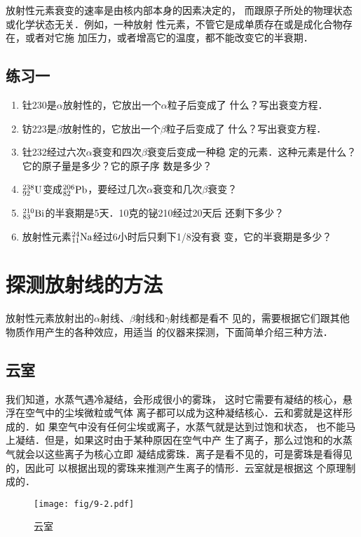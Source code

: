 放射性元素衰变的速率是由核内部本身的因素决定的，
而跟原子所处的物理状态或化学状态无关．例如，一种放射
性元素，不管它是成单质存在或是成化合物存在，或者对它施
加压力，或者增高它的温度，都不能改变它的半衰期．

\subsection*{练习一}
\begin{enumerate}
    \item 钍230是$\alpha$放射性的，它放出一个$\alpha$粒子后变成了
什么？写出衰变方程．
\item 钫223是$\beta$放射性的，它放出一个$\beta$粒子后变成了
什么？写出衰变方程．
\item 钍232经过六次$\alpha$衰变和四次$\beta$衰变后变成一种稳
定的元素．这种元素是什么？它的原子量是多少？它的原子序
数是多少？
\item 
$\atom{U}{238}{92}$变成$\atom{Pb}{206}{82}$，要经过几次$\alpha$衰变和几次$\beta$衰变？
\item 
$\atom{Bi}{210}{83}$的半衰期是5天．10克的铋210经过20天后
还剩下多少？
\item 放射性元素$\atom{Na}{24}{11}$经过6小时后只剩下1/8没有衰
变，它的半衰期是多少？
\end{enumerate}

\section{探测放射线的方法}
放射性元素放射出的$\alpha$射线、$\beta$射线和$\gamma$射线都是看不
见的，需要根据它们跟其他物质作用产生的各种效应，用适当
的仪器来探测，下面简单介绍三种方法．

\subsection{云室}
我们知道，水蒸气遇冷凝结，会形成很小的雾珠，
这时它需要有凝结的核心，悬浮在空气中的尘埃微粒或气体
离子都可以成为这种凝结核心．云和雾就是这样形成的．如
果空气中没有任何尘埃或离子，水蒸气就是达到过饱和状态，
也不能马上凝结．但是，如果这时由于某种原因在空气中产
生了离子，那么过饱和的水蒸气就会以这些离子为核心立即
凝结成雾珠．离子是看不见的，可是雾珠是看得见的，因此可
以根据出现的雾珠来推测产生离子的情形．云室就是根据这
个原理制成的．

\begin{figure}[htp]
    \centering
    \texttt{[image: fig/9-2.pdf]}
    \caption{云室}
\end{figure}

